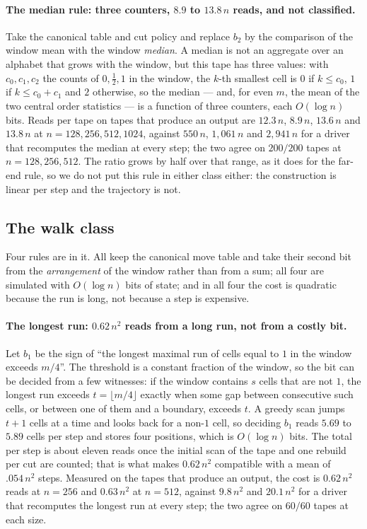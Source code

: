 \documentclass[11pt]{article}
\begin{document}
\paragraph{The median rule: three counters, $8.9$ to $13.8\,n$ reads, and not classified.} Take the canonical table and cut
policy and replace $b_2$ by the comparison of the window mean with the window \emph{median}. A median
is not an aggregate over an alphabet that grows with the window, but this tape has three values: with
$c_0,c_1,c_2$ the counts of $0,\tfrac12,1$ in the window, the $k$-th smallest cell is $0$ if
$k\le c_0$, $1$ if $k\le c_0+c_1$ and $2$ otherwise, so the median --- and, for even $m$, the mean of
the two central order statistics --- is a function of three counters, each $O(\log n)$ bits.
Reads per tape on tapes that produce an output are $12.3\,n$, $8.9\,n$, $13.6\,n$ and $13.8\,n$ at
$n=128,256,512,1024$, against $550\,n$, $1{,}061\,n$ and $2{,}941\,n$ for a driver that recomputes the
median at every step; the two agree on $200/200$ tapes at $n=128,256,512$. The ratio grows by half over that range, as it does for the far-end rule, so we
do not put this rule in either class either: the construction is linear per step and
the trajectory is not.

\subsection{The walk class}
\label{sec:walk}

Four rules are in it. All keep the canonical move table and take their second bit from the
\emph{arrangement} of the window rather than from a sum; all four are simulated with $O(\log n)$ bits
of state; and in all four the cost is quadratic because the run is long, not because a step is
expensive.

\paragraph{The longest run: $0.62\,n^2$ reads from a long run, not from a costly bit.} Let $b_1$ be
the sign of ``the longest maximal run of cells equal to $1$ in the window exceeds $m/4$''. The
threshold is a constant fraction of the window, so the bit can be decided from a few witnesses: if
the window contains $s$ cells that are not $1$, the longest run exceeds $t=\lfloor m/4\rfloor$ exactly
when some gap between consecutive such cells, or between one of them and a boundary, exceeds $t$. A
greedy scan jumps $t+1$ cells at a time and looks back for a non-$1$ cell, so deciding $b_1$ reads
$5.69$ to $5.89$ cells per step and stores four positions, which is $O(\log n)$ bits. The total per
step is about eleven reads once the initial scan of the tape and one rebuild per cut are counted;
that is what makes $0.62\,n^2$ compatible with a mean of $.054\,n^2$ steps. Measured on the tapes that
produce an output, the cost is $0.62\,n^2$ reads at $n=256$ and $0.63\,n^2$ at $n=512$, against
$9.8\,n^2$ and $20.1\,n^2$ for a driver that recomputes the longest run at every step; the two agree
on $60/60$ tapes at each size.
\end{document}
